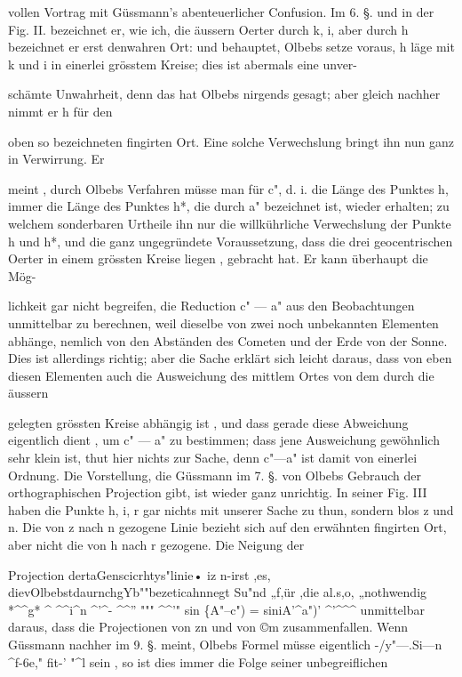 \documentclass[10pt,a4paper]{article}
\begin{document}
vollen Vortrag mit Güssmann's abenteuerlicher Confusion. Im 6. §. und in der Fig. II. bezeichnet er, wie ich, die äussern Oerter durch k, i, aber durch h bezeichnet er erst denwahren Ort: und behauptet, Olbebs setze voraus, h läge mit k und i in einerlei grösstem Kreise; dies ist abermals eine unver-

schämte Unwahrheit, denn das hat Olbebs nirgends gesagt; aber gleich nachher nimmt er h für den

oben so bezeichneten fingirten Ort. Eine solche Verwechslung bringt ihn nun ganz in Verwirrung. Er

meint , durch Olbebs Verfahren müsse man für c", d. i. die Länge des Punktes h, immer die Länge des Punktes h*, die durch a" bezeichnet ist, wieder erhalten; zu welchem sonderbaren Urtheile ihn nur die willkührliche Verwechslung der Punkte h und h*, und die ganz ungegründete Voraussetzung, dass die drei geocentrischen Oerter in einem grössten Kreise liegen , gebracht hat. Er kann überhaupt die Mög-

lichkeit gar nicht begreifen, die Reduction c" — a" aus den Beobachtungen unmittelbar zu berechnen, weil dieselbe von zwei noch unbekannten Elementen abhänge, nemlich von den Abständen des Cometen und der Erde von der Sonne. Dies ist allerdings richtig; aber die Sache erklärt sich leicht daraus, dass von eben diesen Elementen auch die Ausweichung des mittlem Ortes von dem durch die äussern

gelegten grössten Kreise abhängig ist , und dass gerade diese Abweichung eigentlich dient , um c" — a" zu bestimmen; dass jene Ausweichung gewöhnlich sehr klein ist, thut hier nichts zur Sache, denn c"—a" ist damit von einerlei Ordnung. Die Vorstellung, die Güssmann im 7. §. von Olbebs Gebrauch der orthographischen Projection gibt, ist wieder ganz unrichtig. In seiner Fig. III haben die Punkte h, i, r gar nichts mit unserer Sache zu thun, sondern blos z und n. Die von z nach n gezogene Linie bezieht sich auf den erwähnten fingirten Ort, aber nicht die von h nach r gezogene. Die Neigung der

Projection dertaGenscicrhtys"linie• iz n-irst ,es, dievOlbebstdaurnchgYb""bezeticahnnegt Su"nd „f,ür ,die al.s,o, „nothwendig *\textasciicircum{}\textasciicircum{}g* \textasciicircum{} \textasciicircum{}\textasciicircum{}i\textasciicircum{}n \textasciicircum{}'\textasciicircum{}- \textasciicircum{}\textasciicircum{}'' """ \textasciicircum{}\textasciicircum{}'" sin \{A"--c") = siniA'\textasciicircum{}a")' \textasciicircum{}'\textasciicircum{}\textasciicircum{}\textasciicircum{} unmittelbar daraus, dass die Projectionen von zn und von ©m zusammenfallen. Wenn Güssmann nachher im 9. §. meint, Olbebs Formel müsse eigentlich -/y"—.Si—n \textasciicircum{}f-6e," fit-' "\textasciicircum{}l sein , so ist dies immer die Folge seiner unbegreiflichen
\end{document}
